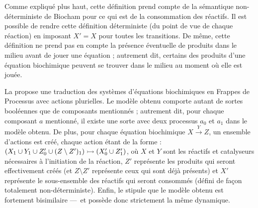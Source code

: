 \begin{remark}
  Comme expliqué plus haut,
  cette définition prend compte de la sémantique non-déterministe de Biocham pour ce qui est
  de la consommation des réactifs.
  Il est possible de rendre cette définition déterministe (du point de vue de chaque réaction)
  en imposant $X' = X$ pour toutes les transitions.
  De même, cette définition ne prend pas en compte la présence éventuelle de produits
  dans le milieu avant de jouer une équation ;
  autrement dit, certains des produits d'une équation biochimique
  peuvent se trouver dans le milieu au moment où elle est jouée.
\end{remark}

La  propose une traduction des systèmes d'équations biochimiques
en Frappes de Processus avec actions plurielles.
Le modèle obtenu comporte autant de sortes booléennes que de composants mentionnés ;
autrement dit, pour chaque composant $a$ mentionné, il existe une sorte avec deux processus
$a_0$ et $a_1$ dans le modèle obtenu.
De plus, pour chaque équation biochimique $X \xrightarrow{Y} Z$,
un ensemble d'actions est créé, chaque action étant de la forme :
$\mbox{$(X_1 \cup Y_1 \cup Z'_0 \cup (Z \setminus Z')_1) \rightarrowtail (X'_0 \cup Z'_1)$}$,
où $X$ et $Y$ sont les réactifs et catalyseurs nécessaires à l'initiation de la réaction,
$Z'$ représente les produits qui seront effectivement créés
(et $Z \setminus Z'$ représente ceux qui sont déjà présents) et
$X'$ représente le sous-ensemble des réactifs qui seront consommés
(défini de façon totalement non-déterministe).
Enfin, le  stipule que le modèle obtenu
est fortement bisimilaire ---~et possède donc strictement la même dynamique.

